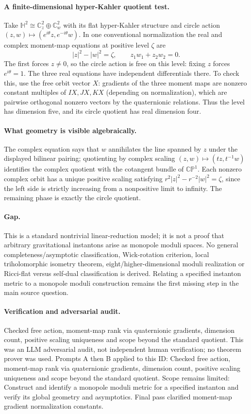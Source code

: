 \documentclass[11pt]{article}
\begin{document}
\paragraph{A finite-dimensional hyper-Kahler quotient test.}Take \(\mathbb H^2\cong\mathbb C_z^2\oplus\mathbb C_w^2\) with its flat hyper-Kahler structure and circle action \((z,w)\mapsto(e^{i\theta}z,e^{-i\theta}w)\). In one conventional normalization the real and complex moment-map equations at positive level \(\zeta\) are
\[|z|^2-|w|^2=\zeta,\qquad z_1w_1+z_2w_2=0.
\]
The first forces \(z\ne0\), so the circle action is free on this level: fixing \(z\) forces \(e^{i\theta}=1\). The three real equations have independent differentials there. To check this, use the free orbit vector \(X\): gradients of the three moment maps are nonzero constant multiples of \(IX,JX,KX\) (depending on normalization), which are pairwise orthogonal nonzero vectors by the quaternionic relations. Thus the level has dimension five, and its circle quotient has real dimension four.
\paragraph{What geometry is visible algebraically.}The complex equation says that \(w\) annihilates the line spanned by \(z\) under the displayed bilinear pairing; quotienting by complex scaling \((z,w)\mapsto(tz,t^{-1}w)\) identifies the complex quotient with the cotangent bundle of \(\mathbb{CP}^1\). Each nonzero complex orbit has a unique positive scaling satisfying \(r^2|z|^2-r^{-2}|w|^2=\zeta\), since the left side is strictly increasing from a nonpositive limit to infinity. The remaining phase is exactly the circle quotient.
\paragraph{Gap.}This is a standard nontrivial linear-reduction model; it is not a proof that arbitrary gravitational instantons arise as monopole moduli spaces. No general completeness/asymptotic classification, Wick-rotation criterion, local triholomorphic isometry theorem, eight/higher-dimensional moduli realization or Ricci-flat versus self-dual classification is derived. Relating a specified instanton metric to a monopole moduli construction remains the first missing step in the main source question.

\paragraph{Verification and adversarial audit.}
Checked free action, moment-map rank via quaternionic gradients, dimension count, positive scaling uniqueness and scope beyond the standard quotient. This was an LLM adversarial audit, not independent human verification; no theorem prover was used. Prompts A then B applied to this ID: Checked free action, moment-map rank via quaternionic gradients, dimension count, positive scaling uniqueness and scope beyond the standard quotient. Scope remains limited: Construct and identify a monopole moduli metric for a specified instanton and verify its global geometry and asymptotics. Final pass clarified moment-map gradient normalization constants.
\end{document}
